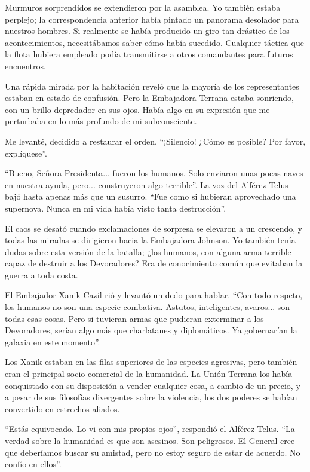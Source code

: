 \documentclass[spanish,12pt,a4paper,oneside,titlepage]{book}
\begin{document}
    Murmuros sorprendidos se extendieron por la asamblea. Yo también estaba perplejo; la correspondencia anterior había pintado un panorama desolador para nuestros hombres. Si realmente se había producido un giro tan drástico de los acontecimientos, necesitábamos saber cómo había sucedido. Cualquier táctica que la flota hubiera empleado podía transmitirse a otros comandantes para futuros encuentros.

    Una rápida mirada por la habitación reveló que la mayoría de los representantes estaban en estado de confusión. Pero la Embajadora Terrana estaba sonriendo, con un brillo depredador en sus ojos. Había algo en su expresión que me perturbaba en lo más profundo de mi subconsciente.

    Me levanté, decidido a restaurar el orden. ``¡Silencio! ¿Cómo es posible? Por favor, explíquese''.

    ``Bueno, Señora Presidenta... fueron los humanos. Solo enviaron unas pocas naves en nuestra ayuda, pero... construyeron algo terrible''. La voz del Alférez Telus bajó hasta apenas más que un susurro. ``Fue como si hubieran aprovechado una supernova. Nunca en mi vida había visto tanta destrucción''.

    El caos se desató cuando exclamaciones de sorpresa se elevaron a un crescendo, y todas las miradas se dirigieron hacia la Embajadora Johnson. Yo también tenía dudas sobre esta versión de la batalla; ¿los humanos, con alguna arma terrible capaz de destruir a los Devoradores? Era de conocimiento común que evitaban la guerra a toda costa.

    El Embajador Xanik Cazil rió y levantó un dedo para hablar. ``Con todo respeto, los humanos no son una especie combativa. Astutos, inteligentes, avaros... son todas esas cosas. Pero si tuvieran armas que pudieran exterminar a los Devoradores, serían algo más que charlatanes y diplomáticos. Ya gobernarían la galaxia en este momento''.

    Los Xanik estaban en las filas superiores de las especies agresivas, pero también eran el principal socio comercial de la humanidad. La Unión Terrana los había conquistado con su disposición a vender cualquier cosa, a cambio de un precio, y a pesar de sus filosofías divergentes sobre la violencia, los dos poderes se habían convertido en estrechos aliados.

    ``Estás equivocado. Lo vi con mis propios ojos'', respondió el Alférez Telus. ``La verdad sobre la humanidad es que son asesinos. Son peligrosos. El General cree que deberíamos buscar su amistad, pero no estoy seguro de estar de acuerdo. No confío en ellos''.
\end{document}

